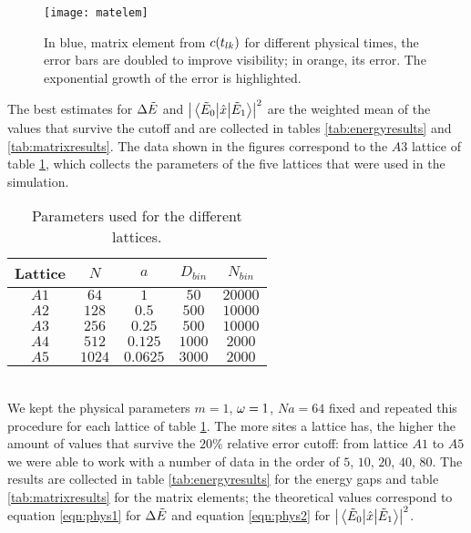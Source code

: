 \begin{figure}[H]
  \centering
  \texttt{[image: matelem]}
  \caption{\label{fig:matA3} In blue, matrix element from $c(t_{lk})$ for different physical times, the error bars are doubled to improve visibility; in orange, its error. The exponential growth of the error
  is highlighted.}
\end{figure}
The best estimates for $\Delta \tilde{E}$ and $\abs{\mel{\tilde{E}_0}{\hat{x}}{\tilde{E}_1}} ^2$ are the weighted mean of the values that survive the cutoff and are collected in tables \ref{tab:energyresults} and \ref{tab:matrixresults}. The data shown in the figures correspond to the $A3$ lattice of table \ref{tab:alllattices}, which collects
the parameters of the five lattices that were used in the simulation.
\begin{table}[h!]
\centering
\begin{tabular}{@{}ccccc@{}}
\toprule
Lattice & $N$    & $a$      & $D_{bin}$ & $N_{bin}$ \\ \midrule
$A1$    & $64$   & $1$      & $50$      & $20000$   \\
$A2$    & $128$  & $0.5$    & $500$     & $10000$   \\
$A3$    & $256$  & $0.25$   & $500$     & $10000$   \\
$A4$    & $512$  & $0.125$  & $1000$    & $2000$    \\
$A5$    & $1024$ & $0.0625$ & $3000$    & $2000$    \\ \bottomrule
\end{tabular}
\caption{Parameters used for the different lattices.}
\label{tab:alllattices}
\end{table}
\\
We kept the physical parameters $m=1$, $\omega=1$, $Na=64$ fixed and repeated this procedure for each lattice of table \ref{tab:alllattices}. The more sites a lattice has, the higher the amount of values that survive the $20\%$ relative error cutoff: from lattice $A1$ to $A5$ we were able to work with a number of data in the order of $5$, $10$, $20$, $40$, $80$.
The results are collected in table \ref{tab:energyresults} for the energy gaps and table \ref{tab:matrixresults} for the matrix elements;
the theoretical values correspond to equation \ref{eqn:phys1} for $\Delta \tilde{E}$ and equation \ref{eqn:phys2} for $\abs{\mel{\tilde{E}_0}{\hat{x}}{\tilde{E}_1}} ^2$.
